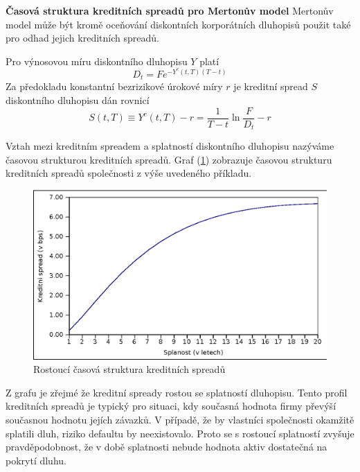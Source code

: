 \documentclass[a4paper]{book}
\begin{document}
\noindent \textbf{Časová struktura kreditních spreadů pro Mertonův model} Mertonův model může být kromě oceňování diskontních korporátních dluhopisů použit také pro odhad jejich kreditních spreadů.

Pro výnosovou míru diskontního dluhopisu $Y$ platí
\begin{equation*}
D_t = F e^{-Y^c(t,T)(T-t)}
\end{equation*}
Za předokladu konstantní bezrizikové úrokové míry $r$ je kreditní spread $S$ diskontního dluhopisu dán rovnicí
\begin{equation*}
S(t,T) \equiv Y^c(t,T) - r = \frac{1}{T-t}\ln \frac{F}{D_t} - r
\end{equation*}

Vztah mezi kreditním spreadem a splatností diskontního dluhopisu nazýváme časovou strukturou kreditních spreadů. Graf (\ref{credit_spread_1}) zobrazuje časovou strukturu kreditních spreadů společnosti z výše uvedeného příkladu.
\begin{figure}
  \centering
  \includegraphics[bb=0 0 350 250]{credit_spread_1.eps}
  \caption{Rostoucí časová struktura kreditních spreadů}
  \label{credit_spread_1}
\end{figure}
Z grafu je zřejmé že kreditní spready rostou se splatností dluhopisu. Tento profil kreditních spreadů je typický pro situaci, kdy současná hodnota firmy převýší současnou hodnotu jejích závazků. V případě, že by vlastníci společnosti okamžitě splatili dluh, riziko defaultu by neexistovalo. Proto se s rostoucí splatností zvyšuje pravděpodobnost, že v době splatnosti nebude hodnota aktiv dostatečná na pokrytí dluhu.
\end{document}
